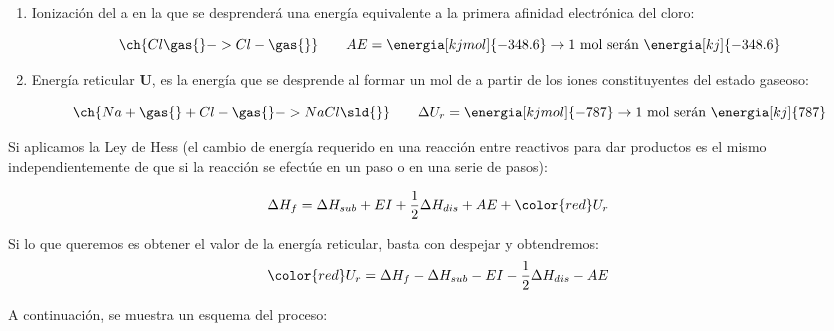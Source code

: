 \begin{enumerate}[label=\numberballmDarkTeal]
\begin{enumerate}[label=\numberballmDarkTeal]
            \begin{equation*}
                \ch{Na \gas{}  -> Na+ \gas{}} \qquad   EI = \energia[kjmol]{495.8} \rightarrow  \text{1 mol serán }  \energia[kj]{495.8}
            \end{equation*}

            \item Ionización del  a  en la que se desprenderá una energía equivalente a la primera afinidad electrónica del cloro:

            \begin{equation*}
                \ch{Cl \gas{}  -> Cl- \gas{}} \qquad   AE = \energia[kjmol]{-348.6} \rightarrow  \text{1 mol serán }  \energia[kj]{-348.6}
            \end{equation*}
            \item Energía reticular \(\bm{U}\), es la energía que se desprende al formar un mol de  a partir de los iones constituyentes del estado gaseoso:

            \begin{equation*}
                \ch{Na+ \gas{} + Cl- \gas{} -> NaCl \sld{}} \qquad  \Delta U_r = \energia[kjmol]{-787} \rightarrow \text{1 mol serán } \energia[kj]{787}
            \end{equation*}

        \end{enumerate}

        Si aplicamos la Ley de Hess (el cambio de energía requerido en una reacción entre reactivos para dar productos es el mismo independientemente de que si la reacción se efectúe en un paso o en una serie de pasos):

        \begin{equation}
            \Delta H_{f} = \Delta H_{sub} + EI + \dfrac{1}{2} \Delta H_{dis} + AE + {\color {red} U_r}
        \end{equation}

        Si lo que queremos es obtener el valor de la energía reticular, basta con despejar y obtendremos:
        \begin{equation}
            {\color {red} U_r}
            = \Delta H_{f} - \Delta H_{sub} - EI - \dfrac{1}{2} \Delta H_{dis} - AE
        \end{equation}

        A continuación, se muestra un esquema del proceso:



\end{enumerate}
